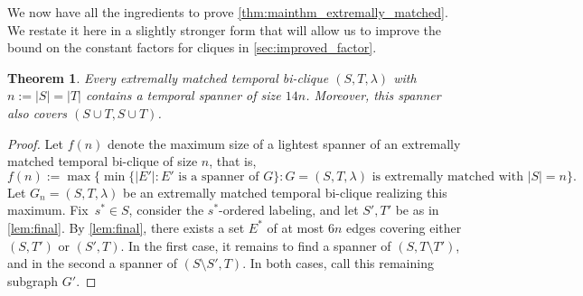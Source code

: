 \documentclass[11pt, letterpaper]{article}
\theoremstyle{definition}
\theoremstyle{plain}
\newtheorem{theorem}[definition]{Theorem}
\begin{document}
We now have all the ingredients to prove \cref{thm:mainthm_extremally_matched}.
We restate it here in a slightly stronger form that will allow us to improve the bound on the constant factors for cliques in \cref{sec:improved_factor}.

\begin{theorem}
\label{thm:mainthm_bicliques_stronger}
Every extremally matched temporal bi-clique $(S,T,\lambda)$ with $n:=|S|=|T|$ contains a temporal spanner of size $14n$.
Moreover, this spanner also covers $(S\cup T, S\cup T)$.
\end{theorem}


\begin{proof}
Let $f(n)$ denote the maximum size of a lightest spanner of an extremally matched temporal bi-clique of size $n$, that is,
\begin{equation*}
f(n):=\max \{\min\{|E'|: E' \text{ is a spanner of } G\}: G=(S,T,\lambda) \text{ is extremally matched with } |S|=n\}.
\end{equation*}
Let $G_n=(S,T,\lambda)$ be an extremally matched temporal bi-clique realizing this maximum.
Fix~${s^*\in S}$, consider the $s^*$-ordered labeling, and let $S',T'$ be as in \cref{lem:final}.
By \cref{lem:final}, there exists a set $E^*$ of at most $6n$ edges covering either $(S,T')$ or $(S',T)$.
In the first case, it remains to find a spanner of $(S,T\setminus T')$, and in the second a spanner of $(S\setminus S',T)$.
In both cases, call this remaining subgraph $G'$.


\end{proof}
\end{document}
